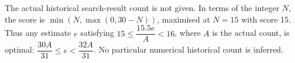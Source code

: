 The actual historical search-result count is not given. In terms of the integer $N$, the score is $\min(N,\max(0,30-N))$, maximised at $N=15$ with score 15. Thus any estimate $e$ satisfying $15\le\dfrac{15.5e}{A}<16$, where $A$ is the actual count, is optimal: $\boxed{\dfrac{30A}{31}\le e<\dfrac{32A}{31}}$. No particular numerical historical count is inferred.
